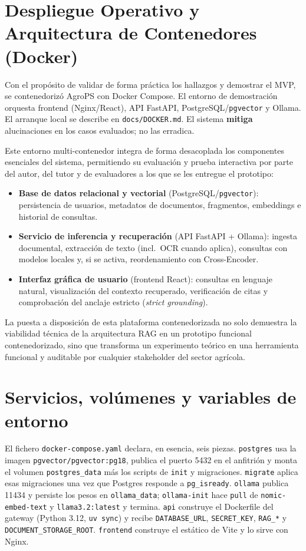 \section{Despliegue Operativo y Arquitectura de Contenedores (Docker)}
Con el propósito de validar de forma práctica los hallazgos y demostrar el MVP, se contenedorizó AgroPS con Docker Compose. El entorno de demostración orquesta frontend (Nginx/React), API FastAPI, PostgreSQL/\texttt{pgvector} y Ollama. El arranque local se describe en \texttt{docs/DOCKER.md}. El sistema \textbf{mitiga} alucinaciones en los casos evaluados; no las erradica.

Este entorno multi-contenedor integra de forma desacoplada los componentes esenciales del sistema, permitiendo su evaluación y prueba interactiva por parte del autor, del tutor y de evaluadores a los que se les entregue el prototipo:

\begin{itemize}
  \item \textbf{Base de datos relacional y vectorial} (PostgreSQL/\texttt{pgvector}): persistencia de usuarios, metadatos de documentos, fragmentos, embeddings e historial de consultas.
  \item \textbf{Servicio de inferencia y recuperación} (API FastAPI + Ollama): ingesta documental, extracción de texto (incl.\ OCR cuando aplica), consultas con modelos locales y, si se activa, reordenamiento con Cross-Encoder.
  \item \textbf{Interfaz gráfica de usuario} (frontend React): consultas en lenguaje natural, visualización del contexto recuperado, verificación de citas y comprobación del anclaje estricto (\emph{strict grounding}).
\end{itemize}

La puesta a disposición de esta plataforma contenedorizada no solo demuestra la viabilidad técnica de la arquitectura RAG en un prototipo funcional contenedorizado, sino que transforma un experimento teórico en una herramienta funcional y auditable por cualquier stakeholder del sector agrícola.

\section{Servicios, volúmenes y variables de entorno}
El fichero \texttt{docker-compose.yaml} declara, en esencia, seis piezas. \texttt{postgres} usa la imagen \texttt{pgvector/pgvector:pg18}, publica el puerto 5432 en el anfitrión y monta el volumen \texttt{postgres\_data} más los scripts de \texttt{init} y migraciones. \texttt{migrate} aplica esas migraciones una vez que Postgres responde a \texttt{pg\_isready}. \texttt{ollama} publica 11434 y persiste los pesos en \texttt{ollama\_data}; \texttt{ollama-init} hace \texttt{pull} de \texttt{nomic-embed-text} y \texttt{llama3.2:latest} y termina. \texttt{api} construye el Dockerfile del gateway (Python 3.12, \texttt{uv sync}) y recibe \texttt{DATABASE\_URL}, \texttt{SECRET\_KEY}, \texttt{RAG\_*} y \texttt{DOCUMENT\_STORAGE\_ROOT}. \texttt{frontend} construye el estático de Vite y lo sirve con Nginx.


